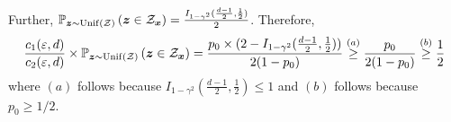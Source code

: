Further, $\mathbb{P}_{{\boldsymbol{z}} \sim \mathrm{Unif}(\mathcal{Z})}\left( {\boldsymbol{z}} \in \mathcal{Z}_{{\boldsymbol{x}}} \right) = \frac{I_{1-\gamma^2}(\frac{d-1}{2},\frac{1}{2})}{2}$. Therefore,
\begin{align}
    \frac{c_1(\varepsilon, d)}{c_2(\varepsilon, d)} \times \mathbb{P}_{{\boldsymbol{z}} \sim \mathrm{Unif}(\mathcal{Z})}\left( {\boldsymbol{z}} \in \mathcal{Z}_{{\boldsymbol{x}}} \right) = \frac{p_0 \times (2 - I_{1-\gamma^2}(\frac{d-1}{2},\frac{1}{2}))}{2(1-p_0)} \stackrel{(a)}{\geq} \frac{p_0}{2(1-p_0)} \stackrel{(b)}{\geq} \frac{1}{2}
\end{align}
where $(a)$ follows because $I_{1-\gamma^2}(\frac{d-1}{2},\frac{1}{2}) \leq 1$ and $(b)$ follows because $p_0 \geq 1/2$.
